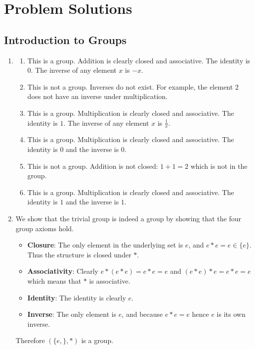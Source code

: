\chapter{Problem Solutions}

\section{Introduction to Groups}
\begin{enumerate}
    \item \begin{enumerate}[label=(\alph*)]
        \item This is a group. Addition is clearly closed and associative. The identity is 0. The inverse of any element $x$ is $-x$.
        \item This is not a group. Inverses do not exist. For example, the element $2$ does not have an inverse under multiplication.
        \item This is a group. Multiplication is clearly closed and associative. The identity is $1$. The inverse of any element $x$ is $\frac1x$.
        \item This is a group. Multiplication is clearly closed and associative. The identity is $0$ and the inverse is $0$.
        \item This is not a group. Addition is not closed: $1 + 1 = 2$ which is not in the group.
        \item This is a group. Multiplication is clearly closed and associative. The identity is $1$ and the inverse is $1$.
    \end{enumerate}

    \item We show that the trivial group is indeed a group by showing that the four group axioms hold.
    \begin{itemize}
        \item \textbf{Closure}: The only element in the underlying set is $e$, and $e \ast e = e \in \{e\}$. Thus the structure is closed under $\ast$.
        \item \textbf{Associativity}: Clearly $e \ast (e \ast e) = e \ast e = e$ and $(e \ast e) \ast e = e \ast e = e$ which means that $\ast$ is associative.
        \item \textbf{Identity}: The identity is clearly $e$.
        \item \textbf{Inverse}: The only element is $e$, and because $e \ast e = e$ hence $e$ is its own inverse.
    \end{itemize}
    Therefore $(\{e,\}, \ast)$ is a group.
\end{enumerate}

